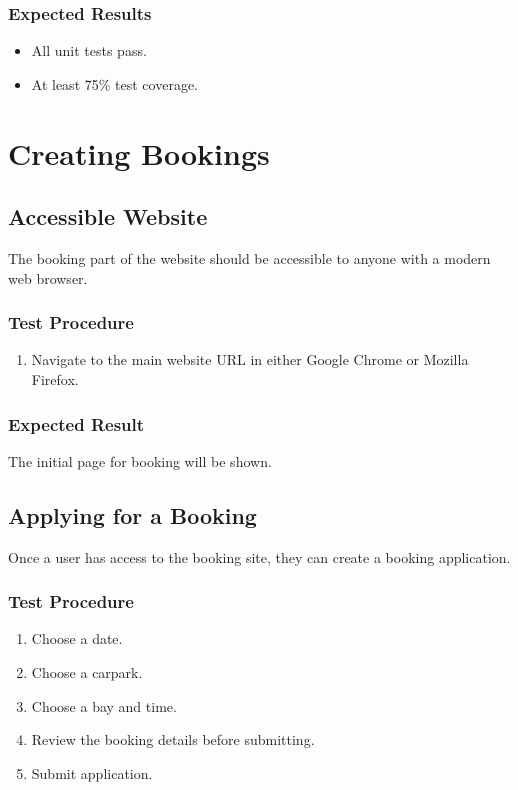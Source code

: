 \documentclass[a4paper, draft]{article}
\begin{document}
\subsubsection{Expected Results}
\begin{itemize}
    \item All unit tests pass.
    \item At least 75\% test coverage.
\end{itemize}

\newpage
\section{Creating Bookings}
\subsection{Accessible Website}
The booking part of the website should be accessible to anyone with a modern web browser.

\subsubsection{Test Procedure}
\begin{enumerate}
    \item Navigate to the main website URL in either Google Chrome or Mozilla Firefox.
\end{enumerate}

\subsubsection{Expected Result}
The initial page for booking will be shown.

\subsection{Applying for a Booking}
Once a user has access to the booking site, they can create a booking application.

\subsubsection{Test Procedure}
\begin{enumerate}
    \item Choose a date.
    \item Choose a carpark.
    \item Choose a bay and time.
    \item Review the booking details before submitting.
    \item Submit application.
\end{enumerate}
\end{document}
